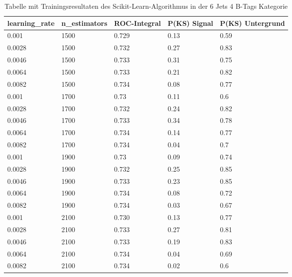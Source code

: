 \begin{table}[tbp]\parbox{12cm}{
  \caption[Scikit-Learn 6j4t Ergebnisse]{Tabelle mit Trainingsresultaten des Scikit-Learn-Algorithmus in der 6 Jets 4 B-Tags Kategorie}%
  }\label{tab:sklearn_6j4t}
  \begin{center}
  \begin{tabular}{lllll}
  \hline
  learning\_rate & n\_estimators & ROC-Integral & P(KS) Signal & P(KS) Untergrund\\
  \hline
\num{0,001}  & \num{1500} & \num{0,729} & \num{0,13} & \num{0,59}\\
\num{0,0028} & \num{1500} & \num{0,732} & \num{0,27} & \num{0,83}\\
\num{0,0046} & \num{1500} & \num{0,733} & \num{0,31} & \num{0,75}\\
\num{0,0064} & \num{1500} & \num{0,733} & \num{0,21} & \num{0,82}\\
\num{0,0082} & \num{1500} & \num{0,734} & \num{0,08} & \num{0,77}\\
\num{0,001}  & \num{1700} & \num{0,73}  & \num{0,11} & \num{0,6}\\
\num{0,0028} & \num{1700} & \num{0,732} & \num{0,24} & \num{0,82}\\
\num{0,0046} & \num{1700} & \num{0,733} & \num{0,34} & \num{0,78}\\
\num{0,0064} & \num{1700} & \num{0,734} & \num{0,14} & \num{0,77}\\
\num{0,0082} & \num{1700} & \num{0,734} & \num{0,04} & \num{0,7}\\
\num{0,001}  & \num{1900} & \num{0,73}  & \num{0,09} & \num{0,74}\\
\num{0,0028} & \num{1900} & \num{0,732} & \num{0,25} & \num{0,85}\\
\num{0,0046} & \num{1900} & \num{0,733} & \num{0,23} & \num{0,85}\\
\num{0,0064} & \num{1900} & \num{0,734} & \num{0,08} & \num{0,72}\\
\num{0,0082} & \num{1900} & \num{0,734} & \num{0,03} & \num{0,67}\\
\num{0,001}  & \num{2100} & \num{0,730} & \num{0,13} & \num{0,77}\\
\num{0,0028} & \num{2100} & \num{0,733} & \num{0,27} & \num{0,81}\\
\num{0,0046} & \num{2100} & \num{0,733} & \num{0,19} & \num{0,83}\\
\num{0,0064} & \num{2100} & \num{0,734} & \num{0,04} & \num{0,69}\\
\num{0,0082} & \num{2100} & \num{0,734} & \num{0,02} & \num{0,6}\\

\end{tabular}
\end{center}
\end{table}
